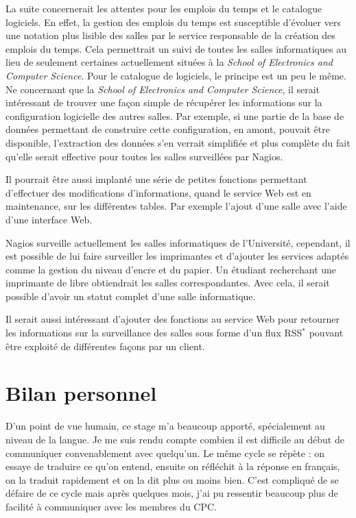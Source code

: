 La suite concernerait les attentes pour les emplois du temps et le catalogue logiciels.
En effet, la gestion des emplois du temps est susceptible d'\'evoluer vers une notation plus lisible des salles par le service responsable de la cr\'eation des emplois du temps.
Cela permettrait un suivi de toutes les salles informatiques au lieu de seulement certaines actuellement situ\'ees \`a la \textit{School of Electronics and Computer Science}.
Pour le catalogue de logiciels, le principe est un peu le m\^eme.
Ne concernant que la \textit{School of Electronics and Computer Science}, il serait int\'eressant de trouver une fa\c{c}on simple de r\'ecup\'erer les informations sur la configuration logicielle des autres salles.
Par exemple, si une partie de la base de donn\'ees permettant de construire cette configuration, en amont, pouvait \^etre disponible, l'extraction des donn\'ees s'en verrait simplifi\'ee et plus compl\`ete du fait qu'elle serait effective pour toutes les salles surveill\'ees par Nagios.

Il pourrait \^etre aussi implant\'e une s\'erie de petites fonctions permettant d'effectuer des modifications d'informations, quand le service Web est en maintenance, sur les diff\'erentes tables.
Par exemple l'ajout d'une salle avec l'aide d'une interface Web.

Nagios surveille actuellement les salles informatiques de l'Universit\'e, cependant, il est possible de lui faire surveiller les imprimantes et d'ajouter les services adapt\'es comme la gestion du niveau d'encre et du papier.
Un \'etudiant recherchant une imprimante de libre obtiendrait les salles correspondantes.
Avec cela, il serait possible d'avoir un statut complet d'une salle informatique.

Il serait aussi int\'eressant d'ajouter des fonctions au service Web pour retourner les informations sur la surveillance des salles sous forme d'un flux RSS$^*$ pouvant \^etre exploit\'e de diff\'erentes fa\c{c}ons par un client.


\section{Bilan personnel}

D'un point de vue humain, ce stage m'a beaucoup apport\'e, sp\'ecialement au niveau de la langue.
Je me suis rendu compte combien il est difficile au d\'ebut de communiquer convenablement avec quelqu'un.
Le m\^eme cycle se r\'ep\`ete : on essaye de traduire ce qu'on entend, ensuite on r\'efl\'echit \`a la r\'eponse en fran\c{c}ais, on la traduit rapidement et on la dit plus ou moins bien.
C'est compliqu\'e de se d\'efaire de ce cycle mais apr\`es quelques mois, j'ai pu ressentir beaucoup plus de facilit\'e \`a communiquer avec les membres du CPC.

